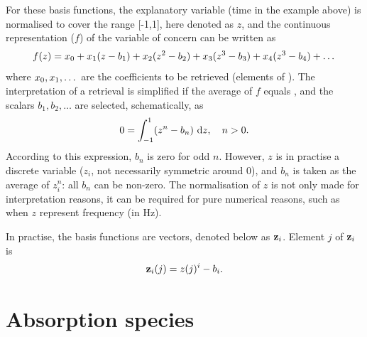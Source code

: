 For these basis functions, the explanatory variable (time in the example above)
is normalised to cover the range [-1,1], here denoted as $z$, and the
continuous representation ($f$) of the variable of concern can be written as
\begin{equation}
  f(z) = x_{0} + x_{1}(z-b_1) + x_{2}(z^2-b_2) + 
                     x_{3}(z^3-b_3) + x_{4}(z^3-b_4) + \dots  
\end{equation}
where $x_{0}, x_{1}, \dots$ are the coefficients to be retrieved
(elements of \SttVct). The interpretation of a retrieval is simplified if the
average of $f$ equals , and the scalars $b_1, b_2, \dots$ are
selected, schematically, as
\begin{equation}
  0 = \int_{-1}^1 \!\left(z^n-b_n\right) \, \mathrm{d} z, \quad n>0.
\end{equation}
According to this expression, $b_n$ is zero for odd $n$. However, $z$ is in
practise a discrete variable ($z_i$, not necessarily symmetric around 0), and
$b_n$ is taken as the average of $z_i^n$: all $b_n$ can be non-zero. The
normalisation of $z$ is not only made for interpretation reasons, it can be
required for pure numerical reasons, such as when $z$ represent frequency (in
Hz).

In practise, the basis functions are vectors, denoted below as $\mathbf{z}_i$.
Element $j$ of $\mathbf{z}_i$ is
\begin{equation}
  \mathbf{z}_i(j) = z(j)^i - b_i.
\end{equation}





\section{Absorption species}
\label{sec:wfuns:absspecies}

